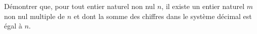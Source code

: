 \documentclass[varwidth]{standalone}
\begin{document}
    D\'emontrer que, pour tout entier naturel non nul $n$, il existe un entier naturel $m$ non nul multiple de $n$ et dont la somme des chiffres dans le syst\`eme d\'ecimal est \'egal \`a $n$.
\end{document}
